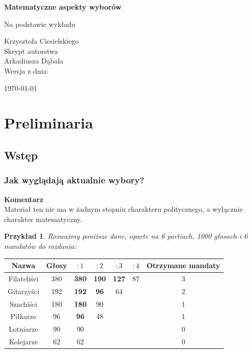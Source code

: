 \documentclass[12pt,a4paper]{article}
\theoremstyle{break}
\newcommand{\Komentarz}[1]{
	\begin{mdframed}[style=zadanie]
		\textbf{Komentarz}\\
		#1
	\end{mdframed}
	}
\newtheorem{example}{Przykład}[section]
\begin{document}
	
	\begin{titlepage}
		\centering
		\vspace{1cm}
		{\Huge\bfseries Matematyczne aspekty wyborów \par} 
		\vspace{1.5cm}
		{\large Na podstawie wykładu \par} 
		\vspace{0.5cm}
		{\Large Krzysztofa Ciesielskiego}\\
		\vspace{1cm}
		{\large Skrypt autorstwa}\\
		\vspace{0.5cm}
		{\Large Arkadiusza Dąbala}\\
		\vfill 
		{\large Wersja z dnia:}\\
		{\Large \today \par}  
		\vspace*{1cm}
	\end{titlepage}
	\newpage
	\tableofcontents
	\newpage
\section{Preliminaria}
\subsection{Wstęp}
\subsubsection{Jak wyglądają aktualnie wybory?}
\Komentarz{Materiał ten nie ma w żadnym stopniu charakteru politycznego, a wyłącznie charakter matematyczny.}

\begin{example}
Rozważmy poniższe dane, oparte na 6 partiach, 1000 głosach i 6 mandatów do rozdania:
\end{example}

\begin{tabular}{|c|c|c|c|c|c|c|}\hline
	Nazwa        & Głosy & $:1$ & $:2$ & $:3$ & $:4$ & Otrzymane mandaty\\\hline
	Filateliści  & 380   & \textbf{380} & \textbf{190} & \textbf{127} & 87   & 3\\\hline
	Gitarzyści   & 192   & \textbf{192} & \textbf{96}  & 64   &       & 2\\\hline
	Szachiści    & 180   & \textbf{180} & 90    &       &       & 1\\\hline
	Piłkarze     & 96    & \textbf{96}  & 48    &       &       & 1\\\hline
	Lotniarze    & 90    & 90    &       &       &       & 0\\\hline
	Kolejarze    & 62    & 62    &       &       &       & 0\\\hline
\end{tabular}\\
\end{document}

